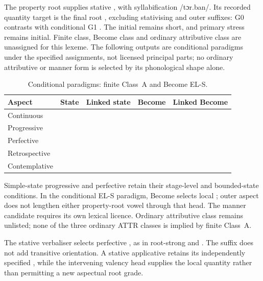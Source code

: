 The property root   supplies stative
 , with syllabification /tɔr.ban/.
Its recorded quantity target is the final root , excluding
stativising  and outer suffixes: G0  contrasts
with conditional G1 . The initial  remains short,
and primary stress remains initial. Finite class, Become class and ordinary
attributive class are unassigned for this lexeme. The following outputs
are conditional paradigms under the specified assignments, not licensed
principal parts; no ordinary attributive or manner form is selected by
its phonological shape alone.

\begin{table}[htbp]
\footnotesize
\caption{Conditional  paradigms: finite Class~A and Become EL-S.}
\label{tab:torban-conditional}
\begin{tabularx}{\textwidth}{l L L L L}
\toprule
Aspect & State & Linked state & Become & Linked Become \\
\midrule
Continuous &  &  &  &  \\
Progressive &  &  &  &  \\
Perfective &  &  &  &  \\
Retrospective &  &  &  &  \\
Contemplative &  &  &  &  \\
\bottomrule
\end{tabularx}
\end{table}

Simple-state progressive and perfective retain their stage-level and
bounded-state conditions. In the conditional EL-S paradigm, Become selects
local ; outer aspect does not lengthen either property-root
vowel through that head. The manner candidate  requires
its own lexical licence. Ordinary attributive class remains unlisted;
none of the three ordinary ATTR classes is implied by finite Class~A.

The stative verbaliser selects perfective , as in root-strong
 and . The suffix does not add transitive
orientation. A stative applicative retains its independently specified
, while the intervening valency head supplies the local quantity
rather than permitting a new aspectual root grade.

